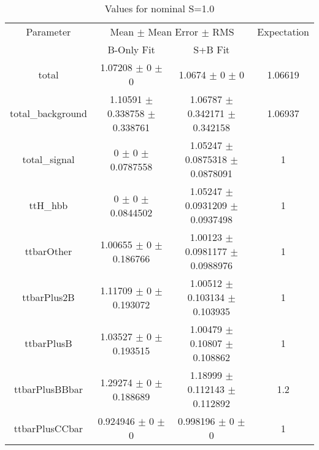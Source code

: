 \begin{table}
\centering
\caption{Values for nominal S=1.0}
\begin{tabular}{cccc}
\toprule
Parameter & \multicolumn{2}{c}{Mean $\pm$ Mean Error $\pm$ RMS} & Expectation\\
 & B-Only Fit & S+B Fit & \\
\midrule
total & \num{1.07208} $\pm$ \num{0} $\pm$ \num{0} & \num{1.0674} $\pm$ \num{0} $\pm$ \num{0} & \num{1.06619}\\
total\_background & \num{1.10591} $\pm$ \num{0.338758} $\pm$ \num{0.338761} & \num{1.06787} $\pm$ \num{0.342171} $\pm$ \num{0.342158} & \num{1.06937}\\
total\_signal & \num{0} $\pm$ \num{0} $\pm$ \num{0.0787558} & \num{1.05247} $\pm$ \num{0.0875318} $\pm$ \num{0.0878091} & \num{1}\\
ttH\_hbb & \num{0} $\pm$ \num{0} $\pm$ \num{0.0844502} & \num{1.05247} $\pm$ \num{0.0931209} $\pm$ \num{0.0937498} & \num{1}\\
ttbarOther & \num{1.00655} $\pm$ \num{0} $\pm$ \num{0.186766} & \num{1.00123} $\pm$ \num{0.0981177} $\pm$ \num{0.0988976} & \num{1}\\
ttbarPlus2B & \num{1.11709} $\pm$ \num{0} $\pm$ \num{0.193072} & \num{1.00512} $\pm$ \num{0.103134} $\pm$ \num{0.103935} & \num{1}\\
ttbarPlusB & \num{1.03527} $\pm$ \num{0} $\pm$ \num{0.193515} & \num{1.00479} $\pm$ \num{0.10807} $\pm$ \num{0.108862} & \num{1}\\
ttbarPlusBBbar & \num{1.29274} $\pm$ \num{0} $\pm$ \num{0.188689} & \num{1.18999} $\pm$ \num{0.112143} $\pm$ \num{0.112892} & \num{1.2}\\
ttbarPlusCCbar & \num{0.924946} $\pm$ \num{0} $\pm$ \num{0} & \num{0.998196} $\pm$ \num{0} $\pm$ \num{0} & \num{1}\\
\bottomrule
\end{tabular}
\end{table}